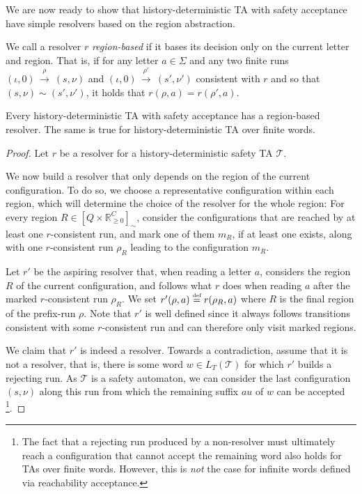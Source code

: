 \documentclass[10pt,a4paper]{amsart}
\theoremstyle{definition}
\numberwithin{equation}{section}
\newcommand{\nnreals}{{\mathbb R}_{\geq 0}}
\newcommand{\x}{\times}
\newcommand{\eqby}[2][=]{\stackrel{\text{{\tiny{#2}}}}{#1}}
\newcommand{\eqdef}{\eqby{def}}
\newcommand{\T}{\mathcal{T}}
\newcommand{\states}{Q}
\newcommand{\clocks}{C}
\newcommand{\valuations}{\nnreals^\clocks}
\newcommand{\lang}{L_T}  %
\newcommand{\step}[2][]{\Step{#2}{}{#1}}
\newcommand{\Step}[3]{\ensuremath{\,{\stackrel{#1}{\longrightarrow}}{}^{\scriptstyle{#2}}_{\scriptstyle{#3}}}\,}
\newcommand{\req}{\sim}
\begin{document}
We are now ready to show that history-deterministic TA with safety acceptance have simple resolvers based on the region abstraction.

We call a resolver $r$
\emph{region-based} if it
bases its decision only on the current letter and region.
That is, 
if for any letter $a\in\Sigma$
and any two finite runs $(\iota,0)\step{\rho}(s,\nu)$ and $(\iota,0)\step{\rho'}(s',\nu')$
consistent with $r$ and so that $(s,\nu)\req(s',\nu')$,
it holds that $r(\rho,a)=r(\rho',a)$.
 
 \begin{lemma}
     \label{lem:region-resolver}
     Every history-deterministic TA with safety acceptance has a region-based resolver.
     The same is true for history-deterministic TA over finite words.
\end{lemma}
\begin{proof}
Let $r$ be a resolver for a history-deterministic safety TA $\T$. %

We now build a resolver that only depends on the region of the current configuration. To do so, we choose a representative configuration within each region, which will determine the choice of the resolver for the whole region:
For every region $R\in [\states\x\valuations]_\req$, consider the configurations that are reached by at least one $r$-consistent run, and mark one of them $m_R$, if at least one exists, along with one $r$-consistent run $\rho_R$ leading to the configuration $m_R$.
 
  Let $r'$ be the aspiring resolver that, when reading a letter $a$, considers the region $R$ of the current configuration, and  follows what $r$ does when reading $a$ after the marked $r$-consistent run $\rho_R$.
  We set $r'(\rho,a)\eqdef r(\rho_R,a)$ where $R$ is the final region of the prefix-run $\rho$. 
  Note that $r'$ is well defined since it always follows transitions consistent with some $r$-consistent run
  and can therefore only visit marked regions.

We claim that $r'$ is indeed a resolver. Towards a contradiction, assume that it is not a resolver, that is, there is some word $w\in \lang(\T)$ for which $r'$ builds a rejecting run.
As $\T$ is a safety automaton, we can consider the last configuration $(s,\nu)$ along this run from which the remaining suffix $au$ of $w$ can be accepted
\footnote{
The fact that a rejecting run produced by a non-resolver must ultimately
reach a configuration that cannot accept the remaining word
also holds for TAs over finite words.
However, this is \emph{not} the case for infinite words defined via reachability acceptance.
}.



\end{proof}
\end{document}
